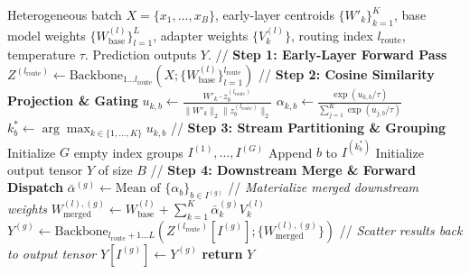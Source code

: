\begin{algorithm}[tb]
\caption{ELATI: Online Inference Pipeline}
\label{alg:elati}
\begin{algorithmic}[1]
 Heterogeneous batch $X = \{x_1, \dots, x_B\}$, early-layer centroids $\{W'_k\}_{k=1}^K$, base model weights $\{W_{\text{base}}^{(l)}\}_{l=1}^L$, adapter weights $\{V_k^{(l)}\}$, routing index $l_{\text{route}}$, temperature $\tau$.
 Prediction outputs $Y$.
\STATE // {\bf Step 1: Early-Layer Forward Pass}
\STATE $Z^{(l_{\text{route}})} \leftarrow \text{Backbone}_{1 \dots l_{\text{route}}}(X; \{W_{\text{base}}^{(l)}\}_{l=1}^{l_{\text{route}}})$
\STATE // {\bf Step 2: Cosine Similarity Projection \& Gating}
        \STATE $u_{k, b} \leftarrow \frac{W'_{k} \cdot z_b^{(l_{\text{route}})}}{\|W'_{k}\|_2 \|z_b^{(l_{\text{route}})}\|_2}$
    \ENDFOR
        \STATE $\alpha_{k, b} \leftarrow \frac{\exp(u_{k, b} / \tau)}{\sum_{j=1}^K \exp(u_{j, b} / \tau)}$
    \ENDFOR
    \STATE $k_b^* \leftarrow \arg\max_{k \in \{1, \dots, K\}} u_{k, b}$
\ENDFOR
\STATE // {\bf Step 3: Stream Partitioning \& Grouping}
\STATE Initialize $G$ empty index groups $I^{(1)}, \dots, I^{(G)}$
    \STATE Append $b$ to $I^{(k_b^*)}$
\ENDFOR
\STATE Initialize output tensor $Y$ of size $B$
\STATE // {\bf Step 4: Downstream Merge \& Forward Dispatch}
    \STATE $\bar{\alpha}^{(g)} \leftarrow \text{Mean of } \{\alpha_{b}\}_{b \in I^{(g)}}$
    \STATE // {\it Materialize merged downstream weights}
        \STATE $W_{\text{merged}}^{(l), (g)} \leftarrow W_{\text{base}}^{(l)} + \sum_{k=1}^K \bar{\alpha}_k^{(g)} V_k^{(l)}$
    \ENDFOR
    \STATE $Y^{(g)} \leftarrow \text{Backbone}_{l_{\text{route}}+1 \dots L}(Z^{(l_{\text{route}})}[I^{(g)}]; \{W_{\text{merged}}^{(l), (g)}\})$
    \STATE // {\it Scatter results back to output tensor}
    \STATE $Y[I^{(g)}] \leftarrow Y^{(g)}$
\ENDFOR
\STATE \textbf{return} $Y$
\end{algorithmic}
\end{algorithm}

